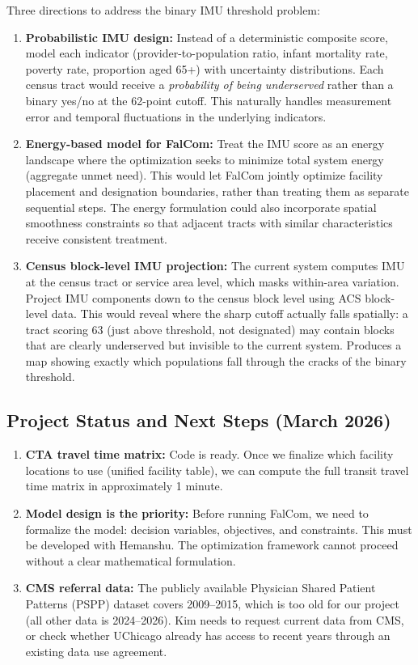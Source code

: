 \documentclass[11pt]{article}
\begin{document}
Three directions to address the binary IMU threshold problem:

\begin{enumerate}
    \item \textbf{Probabilistic IMU design:} Instead of a deterministic composite score, model each indicator (provider-to-population ratio, infant mortality rate, poverty rate, proportion aged 65+) with uncertainty distributions. Each census tract would receive a \emph{probability of being underserved} rather than a binary yes/no at the 62-point cutoff. This naturally handles measurement error and temporal fluctuations in the underlying indicators.

    \item \textbf{Energy-based model for FalCom:} Treat the IMU score as an energy landscape where the optimization seeks to minimize total system energy (aggregate unmet need). This would let FalCom jointly optimize facility placement and designation boundaries, rather than treating them as separate sequential steps. The energy formulation could also incorporate spatial smoothness constraints so that adjacent tracts with similar characteristics receive consistent treatment.

    \item \textbf{Census block-level IMU projection:} The current system computes IMU at the census tract or service area level, which masks within-area variation. Project IMU components down to the census block level using ACS block-level data. This would reveal where the sharp cutoff actually falls spatially: a tract scoring 63 (just above threshold, not designated) may contain blocks that are clearly underserved but invisible to the current system. Produces a map showing exactly which populations fall through the cracks of the binary threshold.
\end{enumerate}

\subsection*{Project Status and Next Steps (March 2026)}

\begin{enumerate}
    \item \textbf{CTA travel time matrix:} Code is ready. Once we finalize which facility locations to use (unified facility table), we can compute the full transit travel time matrix in approximately 1 minute.

    \item \textbf{Model design is the priority:} Before running FalCom, we need to formalize the model: decision variables, objectives, and constraints. This must be developed with Hemanshu. The optimization framework cannot proceed without a clear mathematical formulation.

    \item \textbf{CMS referral data:} The publicly available Physician Shared Patient Patterns (PSPP) dataset covers 2009--2015, which is too old for our project (all other data is 2024--2026). Kim needs to request current data from CMS, or check whether UChicago already has access to recent years through an existing data use agreement.
\end{enumerate}
\end{document}
